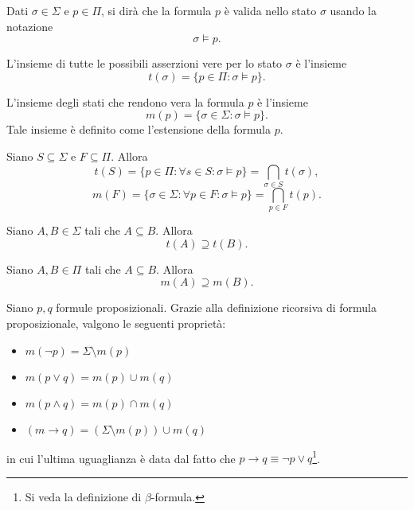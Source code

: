 \documentclass[11pt,a4paper]{article}
\begin{document}
Dati $\sigma \in \Sigma$ e $ p \in \Pi$, si dir\`a che la formula $p$ \`e valida nello stato $\sigma$ usando la notazione $$\sigma \models p.$$

\begin{deff}
	L'insieme di tutte le possibili asserzioni vere per lo stato $\sigma$ \`e l'insieme $$t(\sigma)=\{p \in \Pi : \sigma \models p\}.$$
\end{deff}

\begin{deff}
	L'insieme degli stati che rendono vera la formula $p$ \`e l'insieme $$m(p)=\{\sigma \in \Sigma : \sigma \models p \}.$$
	Tale insieme \`e definito come l'estensione della formula $p$.
\end{deff}

\begin{lemma}
	Siano $S \subseteq \Sigma $ e $F \subseteq \Pi.$ Allora 
	$$t(S)=\{p \in \Pi : \forall s \in S : \sigma \models p  \} = \bigcap_{\sigma \in S}t(\sigma),$$
	$$m(F)=\{\sigma \in \Sigma : \forall p \in F : \sigma \models p  \} = \bigcap_{p \in F}t(p).$$
\end{lemma}

\begin{lemma}
	Siano $A,B \in \Sigma$ tali che $A \subseteq B$. Allora $$ t(A) \supseteq t(B).$$
\end{lemma}

\begin{lemma}
	Siano $A,B \in \Pi$ tali che $A \subseteq B$. Allora $$ m(A) \supseteq m(B).$$
\end{lemma}

\begin{lemma}
	Siano $p,q$ formule proposizionali. Grazie alla definizione ricorsiva di formula proposizionale, valgono le seguenti propriet\`a:
	\begin{itemize}
		\item $m(\neg p) = \Sigma \setminus m(p)$
		\item $m(p \lor q) = m(p) \cup m(q)$
		\item $m(p \land q) = m(p) \cap m(q)$
		\item $(m \rightarrow q) = (\Sigma \setminus m(p) )\cup m(q)$
	\end{itemize}
in cui l'ultima uguaglianza \`e data dal fatto che $p \rightarrow q \equiv \neg p \lor q$\footnote{Si veda la definizione di $\beta$-formula.}.
\end{lemma}
\end{document}
